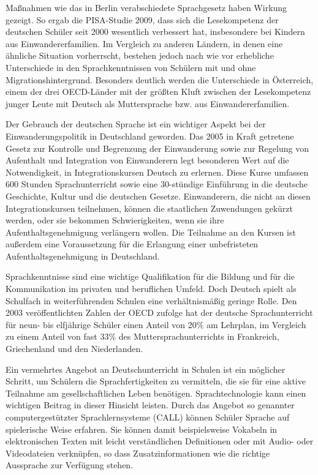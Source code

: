 \documentclass[]{../../metanetpaper}
\begin{document}
\begin{Parallel}[c]{79mm}{78mm}
{Maßnahmen wie das in Berlin verabschiedete Sprachgesetz haben Wirkung gezeigt. So ergab die PISA-Studie 2009, dass sich die Lesekompetenz der deutschen Schüler seit 2000 wesentlich verbessert hat, insbesondere bei Kindern aus Einwandererfamilien. Im Vergleich zu anderen Ländern, in denen eine ähnliche Situation vorherrscht, bestehen jedoch nach wie vor erhebliche Unterschiede in den Sprachkenntnissen von Schülern mit und ohne Migrationshintergrund. Besonders deutlich werden die Unterschiede in Österreich, einem der drei OECD-Länder mit der größten Kluft zwischen der Lesekompetenz junger Leute mit Deutsch als Muttersprache bzw. aus Einwandererfamilien\cite{Pisa1}.

Der Gebrauch der deutschen Sprache ist ein wichtiger Aspekt bei der Einwanderungspolitik in Deutschland geworden. Das 2005 in Kraft getretene Gesetz zur Kontrolle und Begrenzung der Einwanderung sowie zur Regelung von Aufenthalt und Integration von Einwanderern legt besonderen Wert auf die Notwendigkeit, in Integrationskursen Deutsch zu erlernen. Diese Kurse umfassen 600 Stunden Sprachunterricht sowie eine 30-stündige Einführung in die deutsche Geschichte, Kultur und die deutschen Gesetze. Einwanderern, die nicht an diesen Integrationskursen teilnehmen, können die staatlichen Zuwendungen gekürzt werden, oder sie bekommen Schwierigkeiten, wenn sie ihre Aufenthaltsgenehmigung verlängern wollen. Die Teilnahme an den Kursen ist außerdem eine Voraussetzung für die Erlangung einer unbefristeten Aufenthaltsgenehmigung in Deutschland.

Sprachkenntnisse sind eine wichtige Qualifikation für die Bildung und für die Kommunikation im privaten und beruflichen Umfeld. Doch Deutsch spielt als Schulfach in weiterführenden Schulen eine verhältnismäßig geringe Rolle. Den 2003 veröffentlichten Zahlen der OECD zufolge hat der deutsche Sprachunterricht für neun- bis elfjährige Schüler einen Anteil von 20\% am Lehrplan, im Vergleich zu einem Anteil von fast 33\% des Muttersprachunterrichts in Frankreich, Griechenland und den Niederlanden\cite{kmk1}.

Ein vermehrtes Angebot an Deutschunterricht in Schulen ist ein möglicher Schritt, um Schülern die Sprachfertigkeiten zu vermitteln, die sie für eine aktive Teilnahme am gesellschaftlichen Leben benötigen. Sprachtechnologie kann einen wichtigen Beitrag in dieser Hinsicht leisten. Durch das Angebot so genannter computergestützter Sprachlernsysteme (CALL) können Schüler Sprache auf spielerische Weise erfahren. Sie können damit beispielsweise Vokabeln in elektronischen Texten mit leicht verständlichen Definitionen oder mit Audio- oder Videodateien verknüpfen, so dass Zusatzinformationen wie die richtige Aussprache zur Verfügung stehen.
  }


\end{Parallel}
\end{document}
